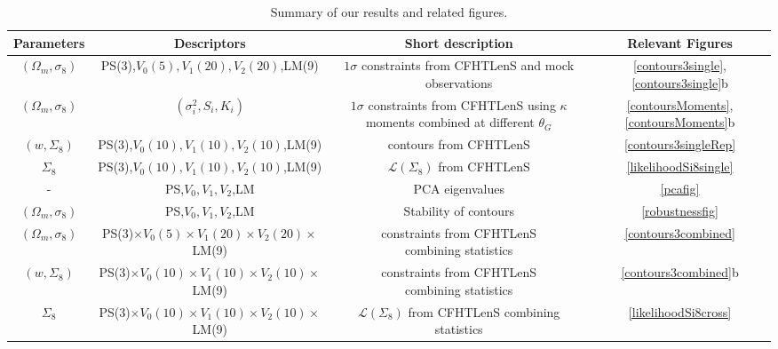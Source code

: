 \documentclass[reprint,aps,prd,superscriptaddress,showkeys,showpacs]{revtex4-1}
\begin{document}
\begin{table*}
\begin{tabular}{c|c|c||c}
Parameters & Descriptors & Short description & Relevant Figures \\ \hline \hline
$(\Omega_m,\sigma_8)$ & PS(3),$V_0(5),V_1(20),V_2(20)$,LM(9) &\pbox{20cm}{$1\sigma$ constraints from CFHTLenS \\ and mock observations}  & \ref{contours3single},\ref{contours3single}b \\ \hline
$(\Omega_m,\sigma_8)$ & $(\sigma_i^2,S_i,K_i)$ & \pbox{20cm}{$1\sigma$ constraints from CFHTLenS \\ using $\kappa$ moments \\ combined at different $\theta_G$}  & \ref{contoursMoments},\ref{contoursMoments}b \\ \hline
$(w,\Sigma_8)$ & PS(3),$V_0(10),V_1(10),V_2(10)$,LM(9) & contours from CFHTLenS & \ref{contours3singleRep} \\ \hline 
$\Sigma_8$ & PS(3),$V_0(10),V_1(10),V_2(10)$,LM(9) & $\mathcal{L}(\Sigma_8)$ from CFHTLenS & \ref{likelihoodSi8single} \\ \hline
- & PS,$V_0,V_1,V_2$,LM & PCA eigenvalues  & \ref{pcafig} \\ \hline
$(\Omega_m,\sigma_8)$ & PS,$V_0,V_1,V_2$,LM & Stability of contours & \ref{robustnessfig} \\ \hline 
$(\Omega_m,\sigma_8)$ & PS(3)$\times V_0(5)\times V_1(20)\times V_2(20)\times$LM(9) & \pbox{20cm}{constraints from CFHTLenS \\ combining statistics} & \ref{contours3combined} \\ \hline
$(w,\Sigma_8)$ & PS(3)$\times V_0(10)\times V_1(10)\times V_2(10)\times$LM(9) & \pbox{20cm}{constraints from CFHTLenS \\ combining statistics} & \ref{contours3combined}b \\ \hline 
$\Sigma_8$ & PS(3)$\times V_0(10)\times V_1(10)\times V_2(10)\times$LM(9) & \pbox{20cm}{$\mathcal{L}(\Sigma_8)$ from CFHTLenS \\ combining statistics} & \ref{likelihoodSi8cross} \\ \hline
\end{tabular}
\caption{Summary of our results and related figures.}
\label{summarytable}
\end{table*}
%
\end{document}
